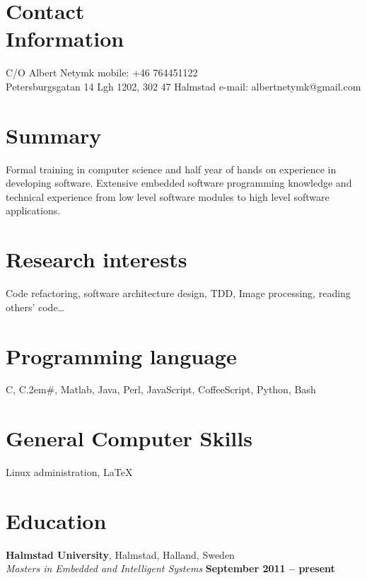 \documentclass[margin,line]{resume}
\begin{document}
\begin{resume}
	\section{\mysidestyle Contact\\Information}
	C/O Albert Netymk													\hfill mobile: +46 764451122         \vspace{0mm}\\\vspace{0mm}%
	Petersburgsgatan 14 Lgh 1202, 302 47 Halmstad						\hfill e-mail:  albertnetymk@gmail.com  \vspace{0mm}\\\vspace{-4.5mm}%
	                                                 

	\section{\mysidestyle Summary}
		Formal training in computer science and half year of hands on experience in developing software.
		Extensive embedded software programming knowledge and technical experience from low level software modules to high level software 
		applications.

	\section{\mysidestyle Research interests} 
		Code refactoring, software architecture design, TDD, Image processing, reading others' code\ldots

	\section{\mysidestyle Programming language} 
	C, C\raise.2em\hbox{{\scriptsize\#}}, Matlab, Java, Perl, JavaScript, CoffeeScript, Python, Bash

	\section{\mysidestyle General Computer Skills} 
		Linux administration, \LaTeX

	\section{\mysidestyle Education}

		\textbf{Halmstad University}, Halmstad, Halland, Sweden \vspace{2mm}\\\vspace{1mm}%
		\textsl{Masters in Embedded and Intelligent Systems} \hfill \textbf{ September 2011 -- present}\vspace{-3mm}\\\vspace{-1mm}%


\end{resume}
\end{document}
